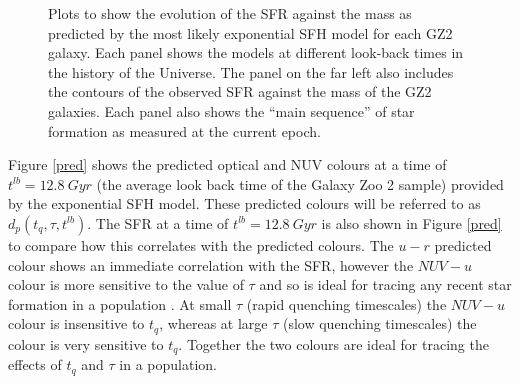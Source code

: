 \documentclass{mn2e}
\begin{document}
\begin{figure}
\caption{Plots to show the evolution of the SFR against the mass as predicted by the most likely exponential SFH model for each GZ2 galaxy. Each panel shows the models at different look-back times in the history of the Universe. The panel on the far left also includes the contours of the observed SFR against the mass of the GZ2 galaxies. Each panel also shows the ``main sequence'' of star formation as measured at the current epoch.}
\label{sfr_mass_evo}
\end{figure}

Figure \ref{pred} shows the predicted optical and NUV colours at a time of $t^{lb} = 12.8 ~Gyr$ (the average look back time of the Galaxy Zoo 2 sample) provided by the exponential SFH model. These predicted colours will be referred to as $d_{p}(t_{q}, \tau, t^{lb})$. The SFR at a time of $t^{lb}=12.8~Gyr$ is also shown in Figure \ref{pred} to compare how this correlates with the predicted colours. The $u-r$ predicted colour shows an immediate correlation with the SFR, however the $NUV-u$ colour is more sensitive to the value of $\tau$ and so is ideal for tracing any recent star formation in a population . At small $\tau$ (rapid quenching timescales) the $NUV-u$ colour is insensitive to $t_{q}$, whereas at large $\tau$ (slow quenching timescales) the colour is very sensitive to $t_{q}$. Together the two colours are ideal for tracing the effects of $t_{q}$ and $\tau$ in a population. 
\end{document}
